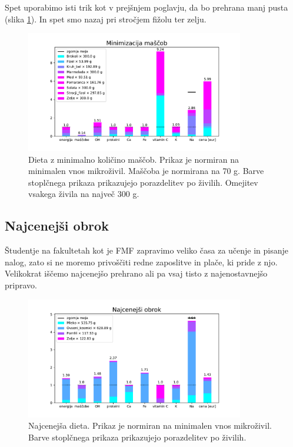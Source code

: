 \documentclass[a4paper, 12pt, slovene]{article}
\numberwithin{equation}{section}
\begin{document}
Spet uporabimo isti trik kot v prejšnjem poglavju, da bo prehrana manj pusta (slika \ref{f:lowfat_300}). In spet smo nazaj pri stročjem fižolu ter zelju.

\begin{figure}[H]
\centering
\includegraphics[width=0.85\textwidth]{grafi/graf_Low_fat_300.pdf}
\caption{Dieta z minimalno količino maščob. Prikaz je normiran na minimalen vnos mikroživil. Maščoba je normirana na 70 g. Barve stoplčnega prikaza prikazujejo porazdelitev po živilih. Omejitev vsakega živila na največ 300 g.}
\label{f:lowfat_300}
\end{figure}



\subsection{Najcenejši obrok}
Študentje na fakultetah kot je FMF zapravimo veliko časa za učenje in pisanje nalog, zato si ne moremo privoščiti redne zaposlitve in plače, ki pride z njo. Velikokrat iščemo najcenejšo prehrano ali pa vsaj tisto z najenostavnejšo pripravo. 

\begin{figure}[H]
\centering
\includegraphics[width=0.85\textwidth]{grafi/graf_Low_price_2000.pdf}
\caption{Najcenejša dieta. Prikaz je normiran na minimalen vnos mikroživil. Barve stoplčnega prikaza prikazujejo porazdelitev po živilih.}
\label{f:lowprice}
\end{figure}
\end{document}
